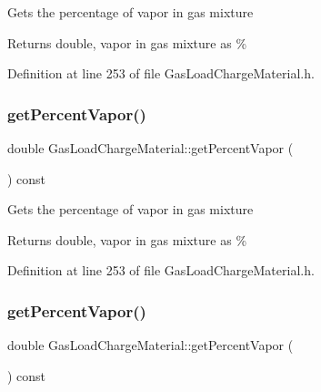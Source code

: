 Gets the percentage of vapor in gas mixture

\begin{DoxyReturn}{Returns}
double, vapor in gas mixture as \% 
\end{DoxyReturn}


Definition at line 253 of file Gas\+Load\+Charge\+Material.\+h.

\mbox{\label{class_gas_load_charge_material_a19b8ecfad235b5824b0a88903cff667a}} 
\subsubsection{\texorpdfstring{get\+Percent\+Vapor()}{getPercentVapor()}\hspace{0.1cm}{\footnotesize\ttfamily [2/3]}}
{\footnotesize\ttfamily double Gas\+Load\+Charge\+Material\+::get\+Percent\+Vapor (\begin{DoxyParamCaption}{ }\end{DoxyParamCaption}) const\hspace{0.3cm}{\ttfamily [inline]}}

Gets the percentage of vapor in gas mixture

\begin{DoxyReturn}{Returns}
double, vapor in gas mixture as \% 
\end{DoxyReturn}


Definition at line 253 of file Gas\+Load\+Charge\+Material.\+h.

\mbox{\label{class_gas_load_charge_material_a19b8ecfad235b5824b0a88903cff667a}} 
\subsubsection{\texorpdfstring{get\+Percent\+Vapor()}{getPercentVapor()}\hspace{0.1cm}{\footnotesize\ttfamily [3/3]}}
{\footnotesize\ttfamily double Gas\+Load\+Charge\+Material\+::get\+Percent\+Vapor (\begin{DoxyParamCaption}{ }\end{DoxyParamCaption}) const\hspace{0.3cm}{\ttfamily [inline]}}

